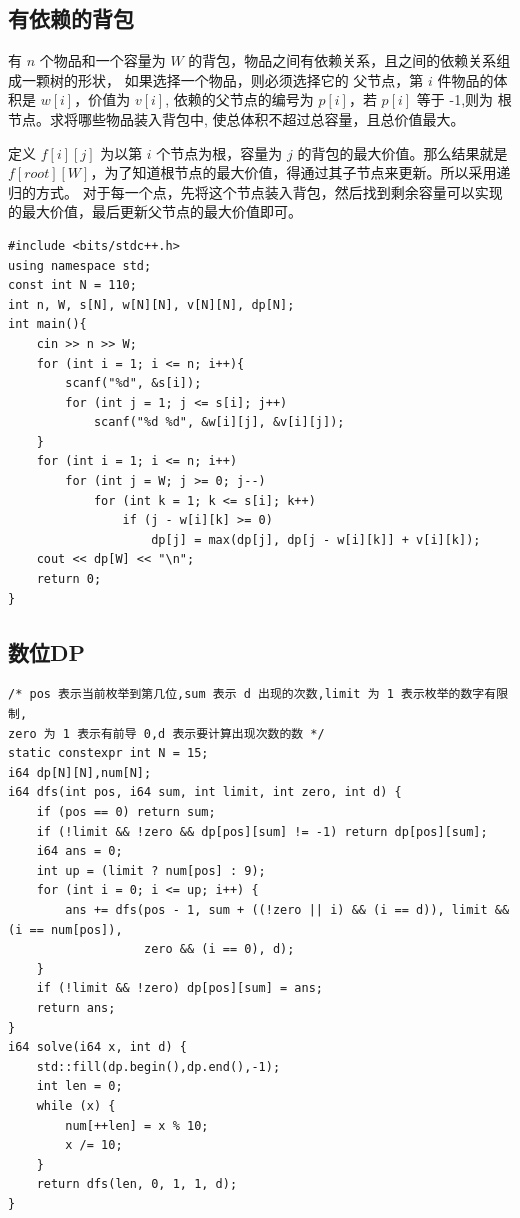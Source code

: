 \subsection{有依赖的背包}
有 $n$ 个物品和一个容量为 $W$ 的背包，物品之间有依赖关系，且之间的依赖关系组成一颗树的形状，
如果选择一个物品，则必须选择它的 父节点，第 $i$ 件物品的体积是 $w[i]$，价值为 $v[i]$,
依赖的父节点的编号为 $p[i]$，若 $p[i]$ 等于 -1,则为 根节点。求将哪些物品装入背包中,
使总体积不超过总容量，且总价值最大。

定义 $f[i][j]$ 为以第 $i$ 个节点为根，容量为 $j$ 的背包的最大价值。那么结果就是 $f[root][W]$，为了知道根节点的最大价值，得通过其子节点来更新。所以采用递归的方式。
对于每一个点，先将这个节点装入背包，然后找到剩余容量可以实现的最大价值，最后更新父节点的最大价值即可。
\begin{lstlisting}[caption={}]
#include <bits/stdc++.h>
using namespace std;
const int N = 110;
int n, W, s[N], w[N][N], v[N][N], dp[N];
int main(){
    cin >> n >> W;
    for (int i = 1; i <= n; i++){
        scanf("%d", &s[i]);
        for (int j = 1; j <= s[i]; j++)
            scanf("%d %d", &w[i][j], &v[i][j]);
    }
    for (int i = 1; i <= n; i++)
        for (int j = W; j >= 0; j--)
            for (int k = 1; k <= s[i]; k++)
                if (j - w[i][k] >= 0)
                    dp[j] = max(dp[j], dp[j - w[i][k]] + v[i][k]);
    cout << dp[W] << "\n";
    return 0;
}
\end{lstlisting}

\subsection{数位DP}
\begin{lstlisting}[caption={}]
/* pos 表示当前枚举到第几位,sum 表示 d 出现的次数,limit 为 1 表示枚举的数字有限制,
zero 为 1 表示有前导 0,d 表示要计算出现次数的数 */
static constexpr int N = 15;
i64 dp[N][N],num[N];
i64 dfs(int pos, i64 sum, int limit, int zero, int d) {
    if (pos == 0) return sum;
    if (!limit && !zero && dp[pos][sum] != -1) return dp[pos][sum];
    i64 ans = 0;
    int up = (limit ? num[pos] : 9);
    for (int i = 0; i <= up; i++) {
        ans += dfs(pos - 1, sum + ((!zero || i) && (i == d)), limit && (i == num[pos]),
                   zero && (i == 0), d);
    }
    if (!limit && !zero) dp[pos][sum] = ans;
    return ans;
}
i64 solve(i64 x, int d) {
	std::fill(dp.begin(),dp.end(),-1);
    int len = 0;
    while (x) {
        num[++len] = x % 10;
        x /= 10;
    }
    return dfs(len, 0, 1, 1, d);
}
\end{lstlisting}


